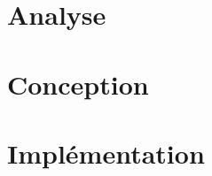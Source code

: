 \documentclass[a4paper,french,towsides,10pt]{book}
\newcommand{\clearemptydoublepage}{%
	\newpage{\pagestyle{empty}\cleardoublepage}}
\begin{document}
\frontmatter
\renewcommand{\labelitemii}{\textasteriskcentered}

\clearemptydoublepage

\clearemptydoublepage
\tableofcontents
\clearemptydoublepage
\mainmatter
\chapter{Analyse}

\chapter{Conception}

\chapter{Implémentation}

\end{document}
